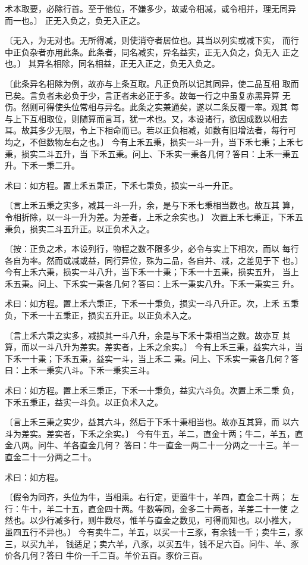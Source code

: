 \documentclass[12pt,UTF8]{ctexbook}
\begin{document}
术本取要，必除行首。至于他位，不嫌多少，故或令相减，或令相并，理无同异 而一也。〕 正无入负之，负无入正之。

〔无入，为无对也。无所得减，则使消夺者居位也。其当以列实或减下实， 而行中正负杂者亦用此条。此条者，同名减实，异名益实，正无入负之，负无入 正之也。〕 其异名相除，同名相益，正无入正之，负无入负之。

〔此条异名相除为例，故亦与上条互取。凡正负所以记其同异，使二品互相 取而已矣。言负者未必负于少，言正者未必正于多。故每一行之中虽复赤黑异算 无伤。然则可得使头位常相与异名。此条之实兼通矣，遂以二条反覆一率。观其 每与上下互相取位，则随算而言耳，犹一术也。又，本设诸行，欲因成数以相去 耳。故其多少无限，令上下相命而已。若以正负相减，如数有旧增法者，每行可 均之，不但数物左右之也。〕 今有上禾五秉，损实一斗一升，当下禾七秉；上禾七秉，损实二斗五升，当 下禾五秉。问上、下禾实一秉各几何？答曰：上禾一秉五升。下禾一秉二升。

术曰：如方程。置上禾五秉正，下禾七秉负，损实一斗一升正。

〔言上禾五秉之实多，减其一斗一升，余，是与下禾七秉相当数也。故互其 算，令相折除，以一斗一升为差。为差者，上禾之余实也。〕 次置上禾七秉正，下禾五秉负，损实二斗五升正。以正负术入之。

〔按：正负之术，本设列行，物程之数不限多少，必令与实上下相次，而以 每行各自为率。然而或减或益，同行异位，殊为二品，各自并、减，之差见于下 也。〕 今有上禾六秉，损实一斗八升，当下禾一十秉；下禾一十五秉，损实五升， 当上禾五秉。问上、下禾实一秉各几何？答曰：上禾一秉实八升。下禾一秉实三 升。

术曰：如方程。置上禾六秉正，下禾一十秉负，损实一斗八升正。次，上禾 五秉负，下禾一十五秉正，损实五升正。以正负术入之。

〔言上禾六秉之实多，减损其一斗八升，余是与下禾十秉相当之数。故亦互 其算，而以一斗八升为差实。差实者，上禾之余实。〕 今有上禾三秉，益实六斗，当下禾一十秉；下禾五秉，益实一斗，当上禾二 秉。问上、下禾实一秉各几何？答曰：上禾一秉实八斗。下禾一秉实三斗。

术曰：如方程。置上禾三秉正，下禾一十秉负，益实六斗负。次置上禾二秉 负，下禾五秉正，益实一斗负。以正负术入之。

〔言上禾三秉之实少，益其六斗，然后于下禾十秉相当也。故亦互其算，而 以六斗为差实。差实者，下禾之余实。〕 今有牛五，羊二，直金十两；牛二，羊五，直金八两。问牛、羊各直金几何？ 答曰：牛一直金一两二十一分两之一十三。羊一直金二十一分两之二十。

术曰：如方程。

〔假令为同齐，头位为牛，当相乘。右行定，更置牛十，羊四，直金二十两； 左行：牛十，羊二十五，直金四十两。牛数等同，金多二十两者，羊差二十一使 之然也。以少行减多行，则牛数尽，惟羊与直金之数见，可得而知也。以小推大， 虽四五行不异也。〕 今有卖牛二，羊五，以买一十三豕，有余钱一千；卖牛三，豕三，以买九羊， 钱适足；卖六羊，八豕，以买五牛，钱不足六百。问牛、羊、豕价各几何？答曰 牛价一千二百。羊价五百。豕价三百。
\end{document}
